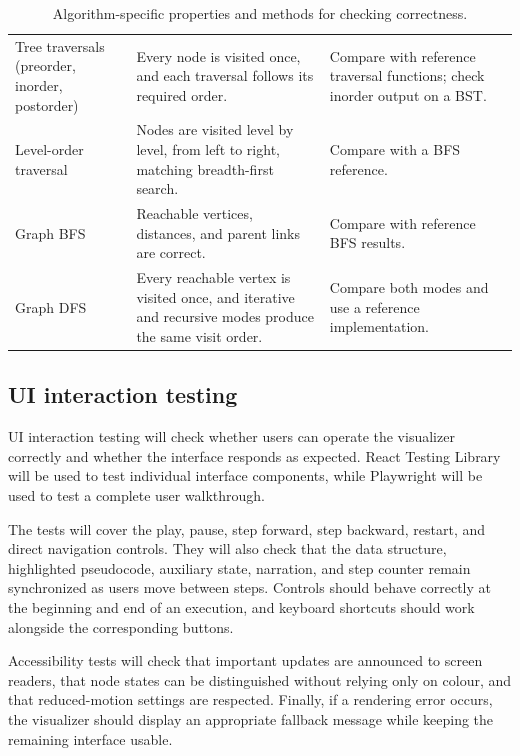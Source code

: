 \documentclass[11pt,a4paper]{article}
\begin{document}
\begin{table}[H]
\begin{tabularx}{\textwidth}{
    @{}
    >{\raggedright\arraybackslash}p{}
    >{\raggedright\arraybackslash}X
    >{\raggedright\arraybackslash}X
    @{}
}
Tree traversals (preorder, inorder, postorder) &
Every node is visited once, and each traversal follows its required order. &
Compare with reference traversal functions; check inorder output on a BST. \\

Level-order traversal &
Nodes are visited level by level, from left to right, matching breadth-first search. &
Compare with a BFS reference. \\

Graph BFS &
Reachable vertices, distances, and parent links are correct. &
Compare with reference BFS results. \\

Graph DFS &
Every reachable vertex is visited once, and iterative and recursive modes produce the same visit order. &
Compare both modes and use a reference implementation. \\

\bottomrule
\end{tabularx}
\caption{Algorithm-specific properties and methods for checking correctness.}
\label{tab:algorithm-testing}
\end{table}


\subsection{UI interaction testing}

UI interaction testing will check whether users can operate the visualizer correctly and whether the interface responds as expected. React Testing Library will be used to test individual interface components, while Playwright will be used to test a complete user walkthrough.

The tests will cover the play, pause, step forward, step backward, restart, and direct navigation controls. They will also check that the data structure, highlighted pseudocode, auxiliary state, narration, and step counter remain synchronized as users move between steps. Controls should behave correctly at the beginning and end of an execution, and keyboard shortcuts should work alongside the corresponding buttons.

Accessibility tests will check that important updates are announced to screen readers, that node states can be distinguished without relying only on colour, and that reduced-motion settings are respected. Finally, if a rendering error occurs, the visualizer should display an appropriate fallback message while keeping the remaining interface usable.
\end{document}
